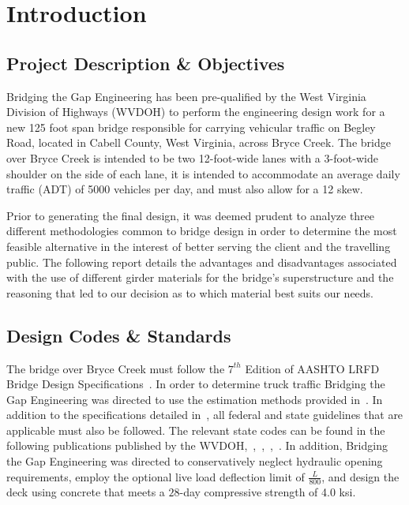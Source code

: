 \chapter{Introduction}\label{sec:1}


\section{Project Description \& Objectives}\label{sec:1.1}

Bridging the Gap Engineering has been pre-qualified by the West Virginia Division of Highways (WVDOH) to perform the engineering design work for a new 125 foot span bridge responsible for carrying vehicular traffic on Begley Road, located in Cabell County, West Virginia, across Bryce Creek. The bridge over Bryce Creek is intended to be two 12-foot-wide lanes with a 3-foot-wide shoulder on the side of each lane, it is intended to accommodate an average daily traffic (ADT) of 5000 vehicles per day, and must also allow for a 12\degree \hspace{0.05cm} skew.

Prior to generating the final design, it was deemed prudent to analyze three different methodologies common to bridge design in order to determine the most feasible alternative in the interest of better serving the client and the travelling public.  The following report details the advantages and disadvantages associated with the use of different girder materials for the bridge's superstructure and the reasoning that led to our decision as to which material best suits our needs.

\section{Design Codes \& Standards}\label{sec:1.2}

The bridge over Bryce Creek must follow the $7^{th}$ Edition of AASHTO LRFD Bridge Design Specifications~\cite{aashto7}. In order to determine truck traffic Bridging the Gap Engineering was directed to use the estimation methods provided in~\cite{aashto7}. In addition to the specifications detailed in~\cite{aashto7}, all federal and state guidelines that are applicable must also be followed.  The relevant state codes can be found in the following publications published by the WVDOH,~\cite{bridgedesignman},~\cite{detail1},~\cite{detail2},~\cite{detail3}.  In addition, Bridging the Gap Engineering  was directed to conservatively neglect hydraulic opening requirements, employ the optional live load deflection limit of $\frac{L}{800}$, and design the deck using concrete that meets a $28$-day compressive strength of 4.0 ksi.

